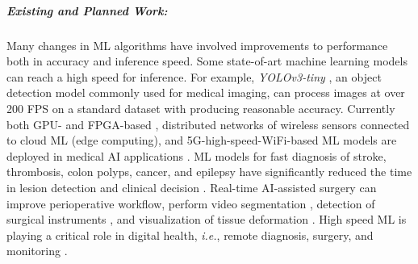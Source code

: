 \subparagraph*{Existing and Planned Work:} Many changes in ML algorithms have involved improvements to performance both in accuracy and inference speed. Some state-of-art machine learning models can reach a high speed for inference. 
For example, \textit{YOLOv3-tiny} \cite{Adarsh2020-hq}, an object detection model commonly used for medical imaging, can process images at over 200 FPS on a standard dataset with producing reasonable accuracy. Currently both GPU- and FPGA-based \cite{Satpathy2020-gs,Chang2020-ob,Zhang2020-bb}, distributed networks of wireless sensors connected to cloud ML (edge computing), and 5G-high-speed-WiFi-based ML models are deployed in medical AI applications \cite{Chen2018-qx,Zhang2020-ze,Morocho-Cayamcela2019-gt}. 
ML models for fast diagnosis of stroke, thrombosis, colon polyps, cancer, and epilepsy have significantly reduced the time in lesion detection and clinical decision \cite{Lee2020-oj,Nafee2020-yy,Nogueira-Rodriguez2020-zd,Bagheri2019-ee,Horie2019-hz}. 
Real-time AI-assisted surgery can improve perioperative workflow, perform video segmentation \cite{Volkov2017-oy}, detection of surgical instruments \cite{Choi2017-iv}, and visualization of tissue deformation \cite{Tonutti2017-vv}. 
High speed ML is playing a critical role in digital health, \textit{i.e.}, remote diagnosis, surgery, and monitoring \cite{Zhang2020-ze}.

